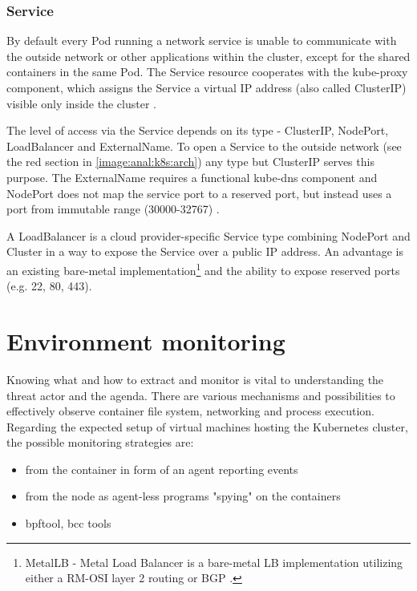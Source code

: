 \subsubsection*{Service \label{anal:k8s:resources:service}}
By default every Pod running a network service is unable to communicate with the outside network or other applications within the cluster, except for the shared containers in the same Pod. The Service resource cooperates with the kube-proxy component, which assigns the Service a virtual IP address (also called ClusterIP) visible only inside the cluster \cite{docs:k8s:concepts:service}.

The level of access via the Service depends on its type - ClusterIP, NodePort, LoadBalancer and ExternalName. To open a Service to the outside network (see the red section in \autoref{image:anal:k8s:arch}) any type but ClusterIP serves this purpose. The ExternalName requires a functional kube-dns component and NodePort does not map the service port to a reserved port, but instead uses a port from immutable range (30000-32767) \cite{docs:k8s:concepts:service}.

A LoadBalancer is a cloud provider-specific Service type combining NodePort and Cluster in a way to expose the Service over a public IP address. An advantage is an existing bare-metal implementation\footnote{MetalLB - Metal Load Balancer is a bare-metal LB implementation utilizing either a RM-OSI layer 2 routing or BGP \cite{docs:metallb}.} and the ability to expose reserved ports (e.g. 22, 80, 443).

\section{Environment monitoring \label{anal:mon}}
Knowing what and how to extract and monitor is vital to understanding the threat actor and the agenda. There are various mechanisms and possibilities to effectively observe container file system, networking and process execution. Regarding the expected setup of virtual machines hosting the Kubernetes cluster, the possible monitoring strategies are:

\begin{itemize}[noitemsep]
	\item
	from the container in form of an agent reporting events
	\item 
	from the node as agent-less programs "spying" on the containers
	\item 
	bpftool, bcc tools
\end{itemize}

